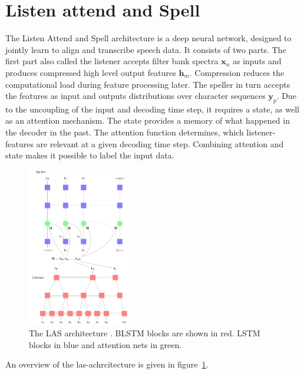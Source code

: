 \documentclass{article}
\begin{document}
\section{Listen attend and Spell}
The Listen Attend and Spell \cite{Chan2015} architecture is a deep neural network, designed to jointly learn to align and transcribe speech data. It consists of two parts.
The first part also called the listener accepts filter bank spectra $\mathbf{x}_n$ as inputs and produces compressed high level output features $\mathbf{h}_m$. Compression reduces the computational load during feature processing later.
The speller in turn accepts the features as input and outputs distributions over character sequences $\mathbf{y}_p$. Due to the uncoupling of the input and decoding time step, it requires a state, as well as an attention mechanism. The state provides a memory of what happened in the decoder in the past. The attention function determines, which listener-features are relevant at a given decoding time step. Combining attention and state makes it possible to label the input data. 
\begin{figure}
\centering
\includegraphics[width=0.4\textwidth]{../tikz/lasArcBottomUp.pdf}
\caption{The LAS architecture \cite{Chan2015}. BLSTM blocks are shown in red. LSTM blocks in blue and attention nets in green.}
\label{fig:las}
\end{figure}
An overview of the las-achrcitecture is given in figure~\ref{fig:las}.
\end{document}
